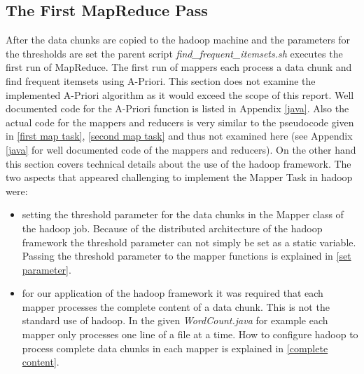 \subsection{The First MapReduce Pass}\label{first pass details}
After the data chunks are copied to the hadoop machine and the parameters for the thresholds are set the parent script \textit{find\_frequent\_itemsets.sh} executes the first run of MapReduce. The first run of mappers each process a data chunk and find frequent itemsets using A-Priori. This section does not examine the implemented A-Priori algorithm as it would exceed the scope of this report. Well documented code for the A-Priori function is listed in Appendix \ref{java}. Also the actual code for the mappers and reducers is very similar to the pseudocode given in \ref{first map task}, \ref{second map task} and thus not examined here (see Appendix \ref{java} for well documented code of the mappers and reducers). On the other hand this section covers technical details about the use of the hadoop framework. The two aspects that appeared challenging to implement the Mapper Task in hadoop were:
\begin{itemize}
\item setting the threshold parameter for the data chunks in the Mapper class of the hadoop job. Because of the distributed architecture of the hadoop framework the threshold parameter can not simply be set as a static variable. Passing the threshold parameter to the mapper functions is explained in \ref{set parameter}. 
\item for our application of the hadoop framework it was required that each mapper processes the complete content of a data chunk. This is not the standard use of hadoop. In the given \textit{WordCount.java} for example each mapper only processes one line of a file at a time. How to configure hadoop to process complete data chunks in each mapper is explained in \ref{complete content}.
\end{itemize}

